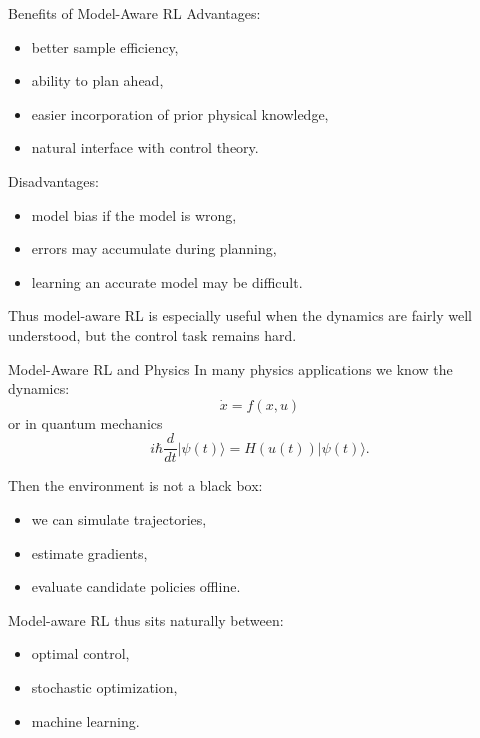\documentclass[aspectratio=169]{beamer}
\begin{document}
\begin{frame}{Benefits of Model-Aware RL}
  Advantages:
  \begin{itemize}
  \item better sample efficiency,
  \item ability to plan ahead,
  \item easier incorporation of prior physical knowledge,
  \item natural interface with control theory.
  \end{itemize}

  Disadvantages:
  \begin{itemize}
  \item model bias if the model is wrong,
  \item errors may accumulate during planning,
  \item learning an accurate model may be difficult.
  \end{itemize}

  Thus model-aware RL is especially useful when the dynamics are fairly well understood, but the control task remains hard.
\end{frame}

\begin{frame}{Model-Aware RL and Physics}
  In many physics applications we know the dynamics:
  \[
  \dot x = f(x,u)
  \]
  or in quantum mechanics
  \[
  i\hbar \frac{d}{dt}\vert \psi(t)\rangle =H(u(t))\vert \psi(t)\rangle.
  \]

  Then the environment is not a black box:
  \begin{itemize}
  \item we can simulate trajectories,
  \item estimate gradients,
  \item evaluate candidate policies offline.
  \end{itemize}

  Model-aware RL thus sits naturally between:
  \begin{itemize}
  \item optimal control,
  \item stochastic optimization,
  \item machine learning.
  \end{itemize}
\end{frame}
\end{document}
